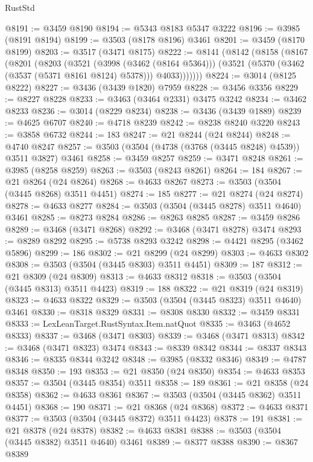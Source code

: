 \begin{lexlean}{RustStd}
\begin{coremodule}
@8191 := @3459 @8190
@8194 := @5343 @8183 @5347 @3222
@8196 := @3985 (@8191 @8194)
@8199 := @3503 (@8178 @8196) @3461
@8201 := @3459 (@8170 @8199)
@8203 := @3517 (@3471 @8175)
@8222 := @8141
    (@8142
      (@8158
        (@8167
          (@8201
            (@8203
              (@3521
                (@3998 (@3462 (@8164 @5364)))
                (@3521 (@5370 (@3462 (@3537 (@5371 @8161 @8124) @5378))) @4033)))))))
@8224 := @3014 (@8125 @8222)
@8227 := @3436 (@3439 @1820) @7959
@8228 := @3456 @3356
@8229 := @8227 @8228
@8233 := @3463 (@3464 @2331) @3475 @3242
@8234 := @3462 @8233
@8236 := @3014 (@8229 @8234)
@8238 := @3436 (@3439 @1889)
@8239 := @4625 @6707
@8240 := @4718 @8239
@8242 := @8238 @8240 @3220
@8243 := @3858 @6732
@8244 := 183
@8247 := @21 @8244 (@24 @8244)
@8248 := @4740 @8247
@8257 := @3503 (@3504 (@4738 (@3768 (@3445 @8248) @4539)) @3511 @3827) @3461
@8258 := @3459 @8257
@8259 := @3471 @8248
@8261 := @3985 (@8258 @8259)
@8263 := @3503 (@8243 @8261)
@8264 := 184
@8267 := @21 @8264 (@24 @8264)
@8268 := @4633 @8267
@8273 := @3503 (@3504 (@3445 @8268) @3511 @4451)
@8274 := 185
@8277 := @21 @8274 (@24 @8274)
@8278 := @4633 @8277
@8284 := @3503 (@3504 (@3445 @8278) @3511 @4640) @3461
@8285 := @8273 @8284
@8286 := @8263 @8285
@8287 := @3459 @8286
@8289 := @3468 (@3471 @8268)
@8292 := @3468 (@3471 @8278) @3474
@8293 := @8289 @8292
@8295 := @5738 @8293 @3242
@8298 := @4421 @8295 (@3462 @5896)
@8299 := 186
@8302 := @21 @8299 (@24 @8299)
@8303 := @4633 @8302
@8308 := @3503 (@3504 (@3445 @8303) @3511 @4451)
@8309 := 187
@8312 := @21 @8309 (@24 @8309)
@8313 := @4633 @8312
@8318 := @3503 (@3504 (@3445 @8313) @3511 @4423)
@8319 := 188
@8322 := @21 @8319 (@24 @8319)
@8323 := @4633 @8322
@8329 := @3503 (@3504 (@3445 @8323) @3511 @4640) @3461
@8330 := @8318 @8329
@8331 := @8308 @8330
@8332 := @3459 @8331
@8333 := LexLeanTarget.RustSyntax.Item.natQuot
@8335 := @3463 (@4652 @8333)
@8337 := @3468 (@3471 @8303)
@8339 := @3468 (@3471 @8313)
@8342 := @3468 (@3471 @8323) @3474
@8343 := @8339 @8342
@8344 := @8337 @8343
@8346 := @8335 @8344 @3242
@8348 := @3985 (@8332 @8346)
@8349 := @4787 @8348
@8350 := 193
@8353 := @21 @8350 (@24 @8350)
@8354 := @4633 @8353
@8357 := @3504 (@3445 @8354) @3511
@8358 := 189
@8361 := @21 @8358 (@24 @8358)
@8362 := @4633 @8361
@8367 := @3503 (@3504 (@3445 @8362) @3511 @4451)
@8368 := 190
@8371 := @21 @8368 (@24 @8368)
@8372 := @4633 @8371
@8377 := @3503 (@3504 (@3445 @8372) @3511 @4423)
@8378 := 191
@8381 := @21 @8378 (@24 @8378)
@8382 := @4633 @8381
@8388 := @3503 (@3504 (@3445 @8382) @3511 @4640) @3461
@8389 := @8377 @8388
@8390 := @8367 @8389

\end{coremodule}
\end{lexlean}

